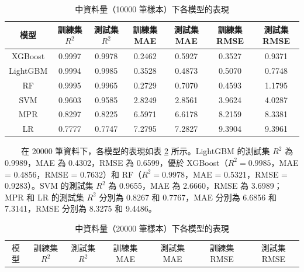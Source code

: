 \documentclass[12pt,a4paper]{article}
\begin{document}
\begin{enumerate}
\begin{enumerate}[label=\arabic*.]
\begin{enumerate}[label=3-2-\arabic*.]
\begin{enumerate}[label=\Alph*.]
                        \begin{table}[H]
                            \centering
                            \caption{中資料量（10000 筆樣本）下各模型的表現}
                            \label{table:medium_data_10000}
                            \begin{tabular}{|c|c|c|c|c|c|c|}
                                \hline
                                模型 & 訓練集 \( R^2 \) & 測試集 \( R^2 \) & 訓練集 MAE & 測試集 MAE & 訓練集 RMSE & 測試集 RMSE \\
                                \hline
                                XGBoost & 0.9997 & 0.9978 & 0.2462 & 0.5927 & 0.3527 & 0.9371 \\
                                LightGBM & 0.9994 & 0.9985 & 0.3528 & 0.4873 & 0.5070 & 0.7748 \\
                                RF & 0.9995 & 0.9965 & 0.2729 & 0.7070 & 0.4593 & 1.1795 \\
                                SVM & 0.9603 & 0.9585 & 2.8249 & 2.8561 & 3.9624 & 4.0287 \\
                                MPR & 0.8297 & 0.8225 & 6.5971 & 6.6178 & 8.2159 & 8.3381 \\
                                LR & 0.7777 & 0.7747 & 7.2795 & 7.2827 & 9.3904 & 9.3961 \\
                                \hline
                            \end{tabular}
                        \end{table}
                    　　在 20000 筆資料下，各模型的表現如表 \ref{table:medium_data_20000} 所示。LightGBM 的測試集 \( R^2 \) 為 0.9989，MAE 為 0.4302，RMSE 為 0.6599，優於 XGBoost（\( R^2 = 0.9985 \)，MAE = 0.4856，RMSE = 0.7632）和 RF（\( R^2 = 0.9978 \)，MAE = 0.5321，RMSE = 0.9283）。SVM 的測試集 \( R^2 \) 為 0.9655，MAE 為 2.6660，RMSE 為 3.6989；MPR 和 LR 的測試集 \( R^2 \) 分別為 0.8267 和 0.7767，MAE 分別為 6.6856 和 7.3141，RMSE 分別為 8.3275 和 9.4486。\\
                        \begin{table}[H]
                            \centering
                            \caption{中資料量（20000 筆樣本）下各模型的表現}
                            \label{table:medium_data_20000}
                            \begin{tabular}{|c|c|c|c|c|c|c|}
                                \hline
                                模型 & 訓練集 \( R^2 \) & 測試集 \( R^2 \) & 訓練集 MAE & 測試集 MAE & 訓練集 RMSE & 測試集 RMSE \\

\end{tabular}
\end{table}
\end{enumerate}
\end{enumerate}
\end{enumerate}
\end{enumerate}
\end{document}
